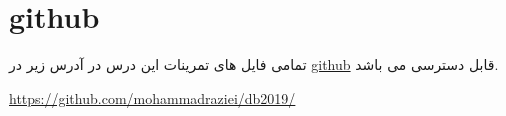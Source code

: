 \documentclass[12pt]{article}
\begin{document}
\section{github}\label{chpt2}
تمامی فایل های تمرینات این درس در آدرس زیر در 
\href{https://github.com/mohammadraziei/db2019/}{github}
قابل دسترسی می باشد.

\begin{latin}
\begin{center}
{\href{https://github.com/mohammadraziei/db2019/}{https://github.com/mohammadraziei/db2019/}}
\end{center}
\end{latin}
\end{document}
